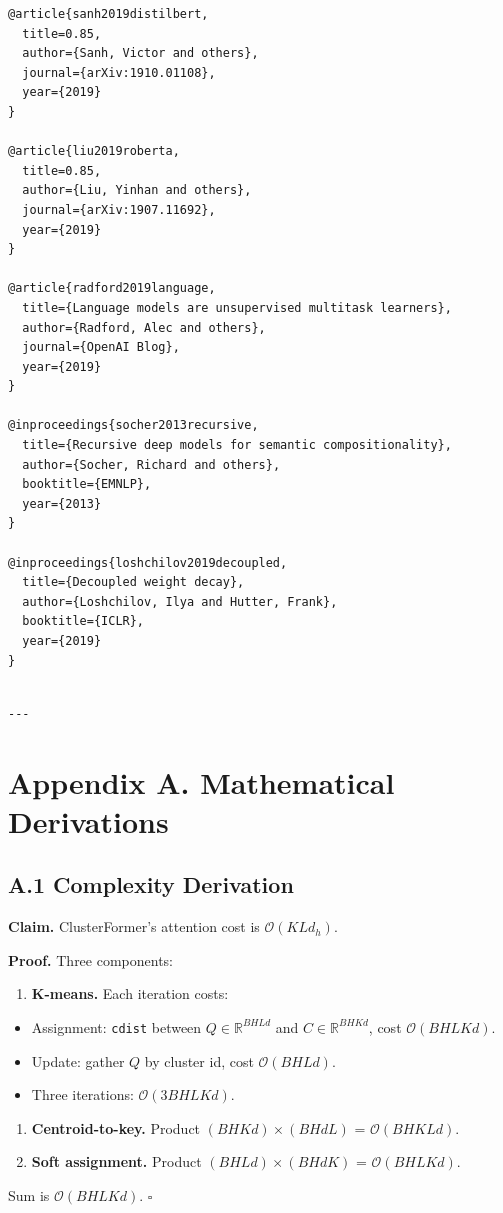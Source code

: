 \begin{lstlisting}
@article{sanh2019distilbert,
  title=0.85,
  author={Sanh, Victor and others},
  journal={arXiv:1910.01108},
  year={2019}
}

@article{liu2019roberta,
  title=0.85,
  author={Liu, Yinhan and others},
  journal={arXiv:1907.11692},
  year={2019}
}

@article{radford2019language,
  title={Language models are unsupervised multitask learners},
  author={Radford, Alec and others},
  journal={OpenAI Blog},
  year={2019}
}

@inproceedings{socher2013recursive,
  title={Recursive deep models for semantic compositionality},
  author={Socher, Richard and others},
  booktitle={EMNLP},
  year={2013}
}

@inproceedings{loshchilov2019decoupled,
  title={Decoupled weight decay},
  author={Loshchilov, Ilya and Hutter, Frank},
  booktitle={ICLR},
  year={2019}
}
\end{lstlisting}
\begin{lstlisting}

---
\end{lstlisting}

\section{Appendix A. Mathematical Derivations}

\subsection{A.1 Complexity Derivation}

\textbf{Claim.} ClusterFormer's attention cost is $\mathcal{O}(K L d_h)$.

\textbf{Proof.} Three components:

\begin{enumerate}
\item \textbf{K-means.} Each iteration costs:
\end{enumerate}
\begin{itemize}
\item Assignment: \texttt{cdist} between $Q \in \mathbb{R}^{BHLd}$ and $C \in \mathbb{R}^{BH K d}$, cost $\mathcal{O}(BHLKd)$.
\item Update: gather $Q$ by cluster id, cost $\mathcal{O}(BHLd)$.
\item Three iterations: $\mathcal{O}(3 BHLKd)$.

\end{itemize}
\begin{enumerate}
\item \textbf{Centroid-to-key.} Product $(BH K d) \times (BH d L)$ = $\mathcal{O}(BHKLd)$.

\item \textbf{Soft assignment.} Product $(BH L d) \times (BH d K)$ = $\mathcal{O}(BH LKd)$.

\end{enumerate}
Sum is $\mathcal{O}(BHLKd)$. $\square$

